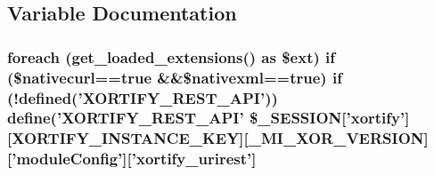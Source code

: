 \subsection{Variable Documentation}
\hypertarget{rest__curlxml_8php_a30be1d56d79c6bb195242bbf90c1ecfe}{
\subsubsection[{\$\-\_\-\-S\-E\-S\-S\-I\-O\-N}]{\setlength{\rightskip}{0pt plus 5cm}foreach (get\-\_\-loaded\-\_\-extensions() as \$ext) {\bf if} (\$nativecurl==true \&\&\$nativexml==true) {\bf if} (!defined('X\-O\-R\-T\-I\-F\-Y\-\_\-\-R\-E\-S\-T\-\_\-\-A\-P\-I')) define('X\-O\-R\-T\-I\-F\-Y\-\_\-\-R\-E\-S\-T\-\_\-\-A\-P\-I' \$\-\_\-\-S\-E\-S\-S\-I\-O\-N\mbox{[}'xortify'\mbox{]}\mbox{[}X\-O\-R\-T\-I\-F\-Y\-\_\-\-I\-N\-S\-T\-A\-N\-C\-E\-\_\-\-K\-E\-Y\mbox{]}\mbox{[}\-\_\-\-M\-I\-\_\-\-X\-O\-R\-\_\-\-V\-E\-R\-S\-I\-O\-N\mbox{]}\mbox{[}'module\-Config'\mbox{]}\mbox{[}'xortify\-\_\-urirest'\mbox{]}}}\label{rest__curlxml_8php_a30be1d56d79c6bb195242bbf90c1ecfe}
